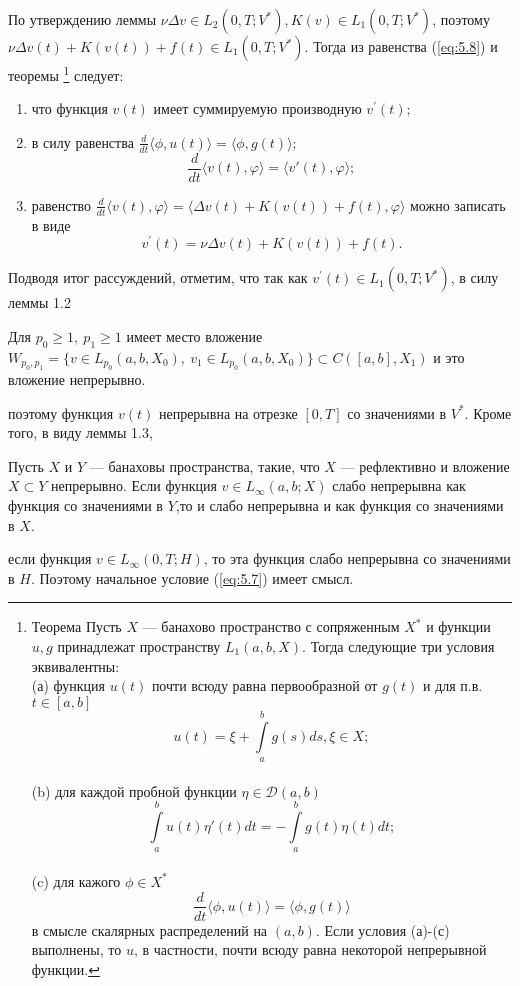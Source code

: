 По утверждению леммы $\nu\Delta v \in L_2(0, T; V^\ast), K(v) \in L_1(0, T; V^\ast)$, поэтому $\nu\Delta v(t) + K(v(t)) + f(t) \in L_1(0, T; V^\ast)$.
Тогда из равенства (\ref{eq:5.8}) и \linebreak теоремы \footnote{Теорема Пусть $X$ --- банахово пространство с сопряженным $X^*$ и функции $u,g$  принадлежат пространству
$L_1(a,b,X).$ Тогда следующие три условия эквивалентны:\\
(а) функция $u(t)$ почти всюду равна первообразной от $g(t)$ и для п.в. $t\in[a,b]$ $$u(t)=\xi+\int\limits_a^b g(s)ds, \xi\in X;$$\\
(b) для каждой пробной функции $\eta\in\mathcal{D}(a,b)$ $$\int\limits_a^b u(t)\eta'(t)dt= -\int\limits_a^b g(t)\eta(t)dt;$$\\
(c) для кажого $\phi\in X^*$ $$\frac{d}{dt}\langle \phi, u(t) \rangle = \langle \phi, g(t) \rangle$$ в смысле скалярных распределений на $(a,b).$
Если условия (а)-(с) выполнены, то $u$, в частности, почти всюду равна некоторой непрерывной функции.} следует:
\begin{enumerate}
    \item что функция $v(t)$ имеет суммируемую производную $v^\prime(t);$
    \item в силу равенства $\frac{d}{dt}\langle \phi, u(t) \rangle = \langle \phi, g(t) \rangle;$
    $$\frac{d}{dt} \langle v(t), \varphi \rangle = \langle v'(t), \varphi \rangle;$$
    \item равенство $\frac{d}{dt}\langle v(t), \varphi \rangle=\langle \Delta v(t)+K(v(t))+f(t),\varphi\rangle$ можно записать в виде
    $$v^\prime(t)=\nu\Delta v(t)+K(v(t))+f(t).$$
\end{enumerate}

Подводя итог рассуждений, отметим, что так как $v^\prime(t) \in L_1(0, T; V^\ast)$, в силу леммы 1.2
\begin{lemma}
Для $p_0\ge 1, \ p_1\ge 1$ имеет место вложение\linebreak
$W_{p_0,p_1}=\{v\in L_{p_0}(a,b,X_0), \ v_1\in L_{p_0}(a,b,X_0)\}\subset C([a,b],X_1)$
и это вложение непрерывно.
\end{lemma}
\noindent
поэтому функция $v(t)$ непрерывна на отрезке $[0, T]$ со значениями в $V^\ast$. 
Кроме того, в виду леммы 1.3,
\begin{lemma}
Пусть $X$ и $Y$ --- банаховы пространства, такие, что $X$ --- рефлективно и вложение $X\subset Y$ непрерывно.
Если функция $v\in L_{\infty}(a,b;X)$ слабо непрерывна как функция со значениями в $Y$,то и слабо непрерывна и как функция со значениями в $X$.
\end{lemma}
\noindent
если функция $v\in L_{\infty} (0,T;H)$, то эта функция слабо непрерывна со значениями в $H$. Поэтому начальное условие (\ref{eq:5.7}) имеет смысл.

